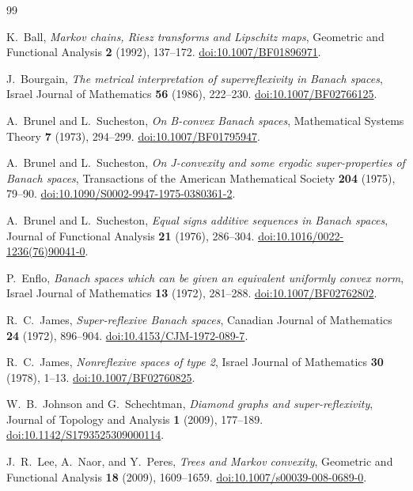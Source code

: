 \begin{thebibliography}{99}

K.~Ball,
\emph{Markov chains, Riesz transforms and Lipschitz maps},
Geometric and Functional Analysis \textbf{2} (1992), 137--172.
\href{https://doi.org/10.1007/BF01896971}{doi:10.1007/BF01896971}.

J.~Bourgain,
\emph{The metrical interpretation of superreflexivity in Banach spaces},
Israel Journal of Mathematics \textbf{56} (1986), 222--230.
\href{https://doi.org/10.1007/BF02766125}{doi:10.1007/BF02766125}.

A.~Brunel and L.~Sucheston,
\emph{On B-convex Banach spaces},
Mathematical Systems Theory \textbf{7} (1973), 294--299.
\href{https://doi.org/10.1007/BF01795947}{doi:10.1007/BF01795947}.

A.~Brunel and L.~Sucheston,
\emph{On J-convexity and some ergodic super-properties of Banach spaces},
Transactions of the American Mathematical Society \textbf{204} (1975), 79--90.
\href{https://doi.org/10.1090/S0002-9947-1975-0380361-2}{doi:10.1090/S0002-9947-1975-0380361-2}.

A.~Brunel and L.~Sucheston,
\emph{Equal signs additive sequences in Banach spaces},
Journal of Functional Analysis \textbf{21} (1976), 286--304.
\href{https://doi.org/10.1016/0022-1236(76)90041-0}{doi:10.1016/0022-1236(76)90041-0}.

P.~Enflo,
\emph{Banach spaces which can be given an equivalent uniformly convex norm},
Israel Journal of Mathematics \textbf{13} (1972), 281--288.
\href{https://doi.org/10.1007/BF02762802}{doi:10.1007/BF02762802}.

R.~C.~James,
\emph{Super-reflexive Banach spaces},
Canadian Journal of Mathematics \textbf{24} (1972), 896--904.
\href{https://doi.org/10.4153/CJM-1972-089-7}{doi:10.4153/CJM-1972-089-7}.

R.~C.~James,
\emph{Nonreflexive spaces of type 2},
Israel Journal of Mathematics \textbf{30} (1978), 1--13.
\href{https://doi.org/10.1007/BF02760825}{doi:10.1007/BF02760825}.

W.~B.~Johnson and G.~Schechtman,
\emph{Diamond graphs and super-reflexivity},
Journal of Topology and Analysis \textbf{1} (2009), 177--189.
\href{https://doi.org/10.1142/S1793525309000114}{doi:10.1142/S1793525309000114}.

J.~R.~Lee, A.~Naor, and Y.~Peres,
\emph{Trees and Markov convexity},
Geometric and Functional Analysis \textbf{18} (2009), 1609--1659.
\href{https://doi.org/10.1007/s00039-008-0689-0}{doi:10.1007/s00039-008-0689-0}.


\end{thebibliography}

